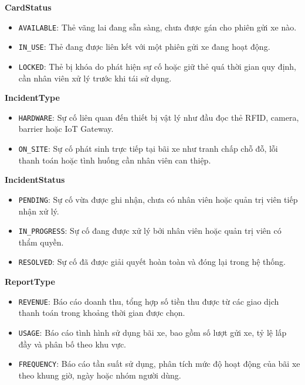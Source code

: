 \noindent\textbf{CardStatus}
\begin{itemize}
	\item \texttt{AVAILABLE}: Thẻ vãng lai đang sẵn sàng, chưa được gán cho phiên gửi xe nào.
	\item \texttt{IN\_USE}: Thẻ đang được liên kết với một phiên gửi xe đang hoạt động.
	\item \texttt{LOCKED}: Thẻ bị khóa do phát hiện sự cố hoặc giữ thẻ quá thời gian quy định, cần nhân viên xử lý trước khi tái sử dụng.
\end{itemize}

\noindent\textbf{IncidentType}
\begin{itemize}
	\item \texttt{HARDWARE}: Sự cố liên quan đến thiết bị vật lý như đầu đọc thẻ RFID, camera, barrier hoặc IoT Gateway.
	\item \texttt{ON\_SITE}: Sự cố phát sinh trực tiếp tại bãi xe như tranh chấp chỗ đỗ, lỗi thanh toán hoặc tình huống cần nhân viên can thiệp.
\end{itemize}

\noindent\textbf{IncidentStatus}
\begin{itemize}
	\item \texttt{PENDING}: Sự cố vừa được ghi nhận, chưa có nhân viên hoặc quản trị viên tiếp nhận xử lý.
	\item \texttt{IN\_PROGRESS}: Sự cố đang được xử lý bởi nhân viên hoặc quản trị viên có thẩm quyền.
	\item \texttt{RESOLVED}: Sự cố đã được giải quyết hoàn toàn và đóng lại trong hệ thống.
\end{itemize}

\noindent\textbf{ReportType}
\begin{itemize}
	\item \texttt{REVENUE}: Báo cáo doanh thu, tổng hợp số tiền thu được từ các giao dịch thanh toán trong khoảng thời gian được chọn.
	\item \texttt{USAGE}: Báo cáo tình hình sử dụng bãi xe, bao gồm số lượt gửi xe, tỷ lệ lấp đầy và phân bố theo khu vực.
	\item \texttt{FREQUENCY}: Báo cáo tần suất sử dụng, phân tích mức độ hoạt động của bãi xe theo khung giờ, ngày hoặc nhóm người dùng.
\end{itemize}
